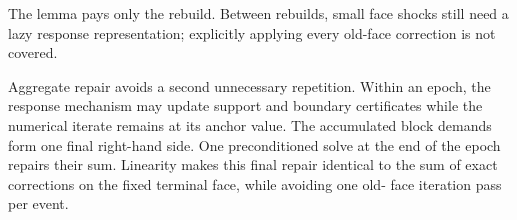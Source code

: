 The lemma pays only the rebuild.  Between rebuilds, small face shocks still
need a lazy response representation; explicitly applying every old-face
correction is not covered.

Aggregate repair avoids a second unnecessary repetition.  Within an epoch,
the response mechanism may update support and boundary certificates while the
numerical iterate remains at its anchor value.  The accumulated block demands
form one final right-hand side.  One preconditioned solve at the end of the
epoch repairs their sum.  Linearity makes this final repair identical to the
sum of exact corrections on the fixed terminal face, while avoiding one old-
face iteration pass per event.
